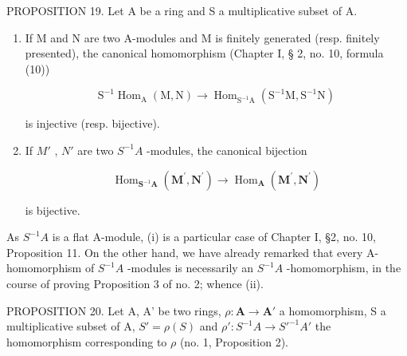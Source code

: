 PROPOSITION 19. Let A be a ring and S a multiplicative subset of A.

\begin{enumerate}
\def\labelenumi{(\roman{enumi})}
\tightlist
\item
  If M and N are two A-modules and M is finitely generated (resp. finitely presented), the canonical homomorphism (Chapter I, § 2, no. 10, formula (10))

\[
\mathrm{S} ^ {- 1} \operatorname{Hom} _ {\mathrm{A}} (\mathrm{M}, \mathrm{N}) \rightarrow \operatorname{Hom} _ {\mathrm{S} ^ {- 1} \mathrm{A}} (\mathrm{S} ^ {- 1} \mathrm{M}, \mathrm{S} ^ {- 1} \mathrm{N})
\]

is injective (resp. bijective).

\item
  If \(M'\) , \(N'\) are two \(S^{-1}A\) -modules, the canonical bijection

\[
\operatorname{Hom} _ {\mathbf {S} ^ {- 1} \mathbf {A}} (\mathbf {M} ^ {\prime}, \mathbf {N} ^ {\prime}) \rightarrow \operatorname{Hom} _ {\mathbf {A}} (\mathbf {M} ^ {\prime}, \mathbf {N} ^ {\prime})
\]

is bijective.

\end{enumerate}
As \(S^{-1}A\) is a flat A-module, (i) is a particular case of Chapter I, §2, no. 10, Proposition 11. On the other hand, we have already remarked that every A-homomorphism of \(S^{-1}A\) -modules is necessarily an \(S^{-1}A\) -homomorphism, in the course of proving Proposition 3 of no. 2; whence (ii).

PROPOSITION 20. Let A, A' be two rings, \(\rho: \mathbf{A} \to \mathbf{A}'\) a homomorphism, S a multiplicative subset of A, \(S' = \rho(S)\) and \(\rho': S^{-1}A \to S'^{-1}A'\) the homomorphism corresponding to \(\rho\) (no. 1, Proposition 2).

